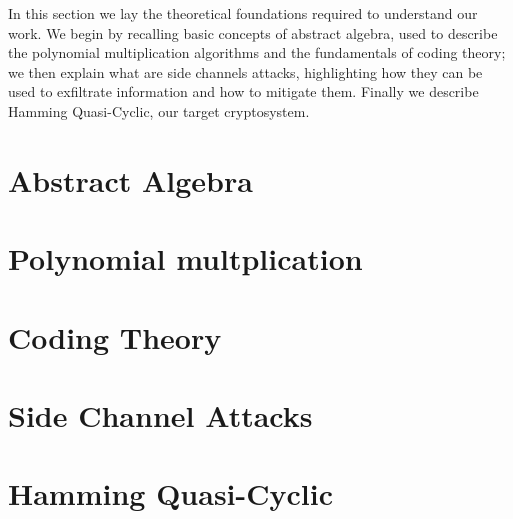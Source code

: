 In this section we lay the theoretical foundations required to understand our work. 
We begin by recalling basic concepts of abstract algebra, used to describe the polynomial multiplication algorithms and the 
fundamentals of coding theory; we then explain what are side channels attacks, highlighting how they can be used to exfiltrate
information and how to mitigate them. Finally we describe Hamming Quasi-Cyclic, our target cryptosystem.
\section{Abstract Algebra}


\section{Polynomial multplication}

\newpage
\section{Coding Theory}


\section{Side Channel Attacks}

\newpage
\section{Hamming Quasi-Cyclic}

\newpage
